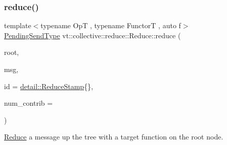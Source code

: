 \mbox{\label{structvt_1_1collective_1_1reduce_1_1_reduce_a7389031519cb9fd1b8dde2c3b19db7e0}} 
\subsubsection{\texorpdfstring{reduce()}{reduce()}\hspace{0.1cm}{\footnotesize\ttfamily [10/10]}}
{\footnotesize\ttfamily template$<$typename OpT , typename FunctorT , auto f$>$ \\
\hyperlink{structvt_1_1collective_1_1reduce_1_1_reduce_a0474b491f3c93014d9a0ce0356c6bfd5}{Pending\+Send\+Type} vt\+::collective\+::reduce\+::\+Reduce\+::reduce (\begin{DoxyParamCaption}\item[{\hyperlink{namespacevt_a866da9d0efc19c0a1ce79e9e492f47e2}{Node\+Type} const \&}]{root,  }\item[{typename \hyperlink{structvt_1_1_func_traits}{Func\+Traits}$<$ decltype(f)$>$\+::MsgT $\ast$}]{msg,  }\item[{\hyperlink{namespacevt_1_1collective_1_1reduce_1_1detail_abcd205dec83706f347d55c7528bf2664}{detail\+::\+Reduce\+Stamp}}]{id = {\ttfamily \hyperlink{namespacevt_1_1collective_1_1reduce_1_1detail_abcd205dec83706f347d55c7528bf2664}{detail\+::\+Reduce\+Stamp}\{\}},  }\item[{\hyperlink{structvt_1_1collective_1_1reduce_1_1_reduce_a6c3e63aca10c31d2823b0b18cf9762a4}{Reduce\+Num\+Type} const \&}]{num\+\_\+contrib = {} }\end{DoxyParamCaption})\hspace{0.3cm}{\ttfamily [inline]}}



\hyperlink{structvt_1_1collective_1_1reduce_1_1_reduce}{Reduce} a message up the tree with a target function on the root node. 


